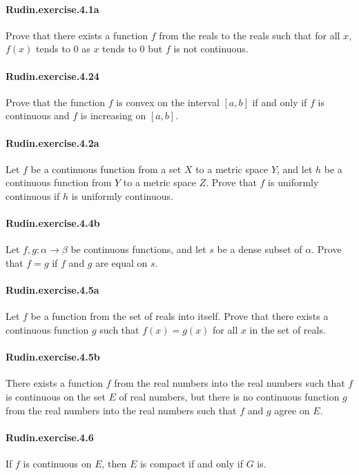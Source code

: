 \documentclass{article}
\begin{document}
\paragraph{Rudin.exercise.4.1a} Prove that there exists a function $f$ from the reals to the reals such that for all $x$, $f(x)$ tends to $0$ as $x$ tends to $0$ but $f$ is not continuous.

\paragraph{Rudin.exercise.4.24} Prove that the function $f$ is convex on the interval $[a, b]$ if and only if $f$ is continuous and $f$ is increasing on $[a, b]$.

\paragraph{Rudin.exercise.4.2a} Let $f$ be a continuous function from a set $X$ to a metric space $Y$, and let $h$ be a continuous function from $Y$ to a metric space $Z$. Prove that $f$ is uniformly continuous if $h$ is uniformly continuous.

\paragraph{Rudin.exercise.4.4b} Let $f,g: \alpha \to \beta$ be continuous functions, and let $s$ be a dense subset of $\alpha$. Prove that $f=g$ if $f$ and $g$ are equal on $s$.

\paragraph{Rudin.exercise.4.5a} Let $f$ be a function from the set of reals into itself. Prove that there exists a continuous function $g$ such that $f(x)=g(x)$ for all $x$ in the set of reals.

\paragraph{Rudin.exercise.4.5b} There exists a function $f$ from the real numbers into the real numbers such that $f$ is continuous on the set $E$ of real numbers, but there is no continuous function $g$ from the real numbers into the real numbers such that $f$ and $g$ agree on $E$.

\paragraph{Rudin.exercise.4.6} If $f$ is continuous on $E$, then $E$ is compact if and only if $G$ is.
\end{document}
